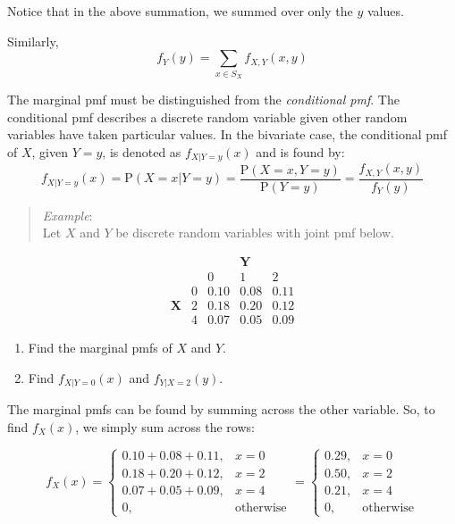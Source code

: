\documentclass[
  letterpaper,
  DIV=11,
  numbers=noendperiod]{scrreprt}
\begin{document}
Notice that in the above summation, we summed over only the \(y\)
values.

Similarly, \[
f_Y(y)=\sum_{x \in S_X}f_{X,Y}(x,y)
\]

The marginal pmf must be distinguished from the \emph{conditional pmf}.
The conditional pmf describes a discrete random variable given other
random variables have taken particular values. In the bivariate case,
the conditional pmf of \(X\), given \(Y=y\), is denoted as
\(f_{X|Y=y}(x)\) and is found by: \[
f_{X|Y=y}(x)=\mbox{P}(X=x|Y=y)=\frac{\mbox{P}(X=x,Y=y)}{\mbox{P}(Y=y)}=\frac{f_{X,Y}(x,y)}{f_Y(y)}
\]

\begin{quote}
\emph{Example}:\\
Let \(X\) and \(Y\) be discrete random variables with joint pmf below.
\end{quote}

\[
\begin{array}{cc|ccc} & & & \textbf{Y} &
\\ & & 0 & 1 & 2  
\\ & \hline 0 & 0.10 & 0.08 & 0.11  
\\\textbf{X} &2 & 0.18 & 0.20 & 0.12  
\\ & 4 & 0.07 & 0.05 & 0.09 
\end{array} 
\]

\begin{enumerate}
\def\labelenumi{\alph{enumi})}
\item
  Find the marginal pmfs of \(X\) and \(Y\).
\item
  Find \(f_{X|Y=0}(x)\) and \(f_{Y|X=2}(y)\).
\end{enumerate}

The marginal pmfs can be found by summing across the other variable. So,
to find \(f_X(x)\), we simply sum across the rows:

\[
f_X(x)=\left\{\begin{array}{ll} 0.10+0.08+0.11, & x=0 \\
0.18+0.20+0.12, & x=2 \\
0.07+0.05+0.09, & x=4 \\
0, & \mbox{otherwise} 
\end{array}\right. = \left\{\begin{array}{ll} 0.29, & x=0 \\
0.50, & x=2 \\
0.21, & x=4 \\
0, & \mbox{otherwise} 
\end{array}\right.
\]
\end{document}
